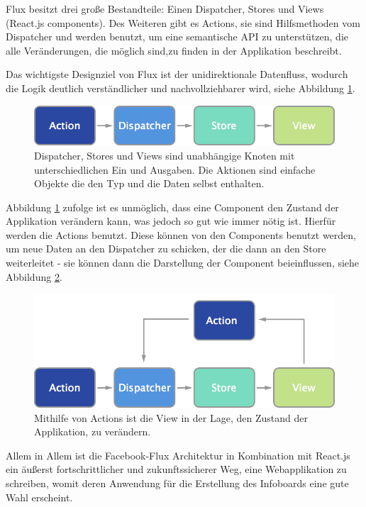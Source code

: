 \documentclass[12pt,twoside]{book}
\begin{document}
Flux besitzt drei große Bestandteile: Einen Dispatcher, Stores und Views (React.js components). Des Weiteren gibt es Actions, sie sind Hilfsmethoden vom Dispatcher und werden benutzt, um eine semantische API zu unterstützen, die alle Veränderungen, die möglich sind,zu finden in der Applikation beschreibt.

Das wichtigste Designziel von Flux ist der unidirektionale Datenfluss, wodurch die Logik deutlich verständlicher und nachvollziehbarer wird, siehe Abbildung \ref{fig:flux}.

\begin{figure}[htbp]
    \centering
    \includegraphics[width=1.0\textwidth]{images/flux.png}
    \caption{Dispatcher, Stores und Views sind unabhängige Knoten mit unterschiedlichen Ein und Ausgaben. Die Aktionen sind einfache Objekte die den Typ und die Daten selbst enthalten.}
    \label{fig:flux}
\end{figure}

Abbildung \ref{fig:flux} zufolge ist es unmöglich, dass eine Component den Zustand der Applikation verändern kann, was jedoch so gut wie immer nötig ist. Hierfür werden die Actions benutzt. Diese können von den Components benutzt werden, um neue Daten an den Dispatcher zu schicken, der die dann an den Store weiterleitet - sie können dann die Darstellung der Component beieinflussen, siehe Abbildung \ref{fig:flux_actions}.

\begin{figure}[htbp]
    \centering
    \includegraphics[width=1.0\textwidth]{images/flux_actions.png}
    \caption{Mithilfe von Actions ist die View in der Lage, den Zustand der Applikation, zu verändern.}
    \label{fig:flux_actions}
\end{figure}

Allem in Allem ist die Facebook-Flux Architektur in Kombination mit React.js ein äußerst fortschrittlicher und zukunftssicherer Weg, eine Webapplikation zu schreiben, womit deren Anwendung für die Erstellung des Infoboards eine gute Wahl erscheint.
\end{document}
